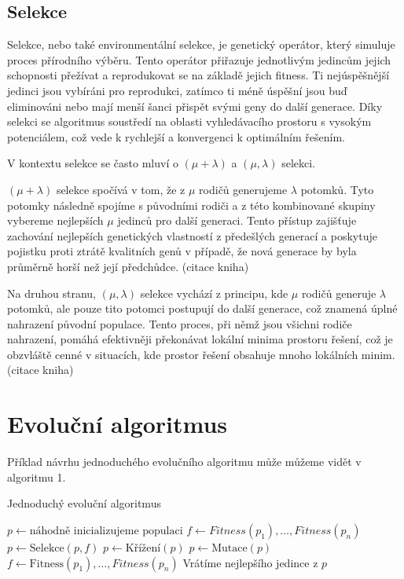 \subsection{Selekce}
Selekce, nebo také environmentální selekce, je genetický operátor, který simuluje proces přírodního výběru. Tento operátor přiřazuje jednotlivým jedincům jejich schopnosti přežívat a reprodukovat se na základě jejich fitness. Ti nejúspěšnější jedinci jsou vybíráni pro reprodukci, zatímco ti méně úspěšní jsou buď eliminováni nebo mají menší šanci přispět svými geny do další generace. Díky selekci se algoritmus soustředí na oblasti vyhledávacího prostoru s vysokým potenciálem, což vede k rychlejší a konvergenci k optimálním řešením. 

V kontextu selekce se často mluví o $(\mu + \lambda)$ a $(\mu, \lambda)$ selekci. 

$(\mu + \lambda)$ selekce spočívá v tom, že z $\mu$ rodičů generujeme $\lambda$ potomků. Tyto potomky následně spojíme s původními rodiči a z této kombinované skupiny vybereme nejlepších $\mu$ jedinců pro další generaci. Tento přístup zajišťuje zachování nejlepších genetických vlastností z předešlých generací a poskytuje pojistku proti ztrátě kvalitních genů v případě, že nová generace by byla průměrně horší než její předchůdce. (citace kniha)

Na druhou stranu, $(\mu, \lambda)$ selekce vychází z principu, kde $\mu$ rodičů generuje $\lambda$ potomků, ale pouze tito potomci postupují do další generace, což znamená úplné nahrazení původní populace. Tento proces, při němž jsou všichni rodiče nahrazení, pomáhá efektivněji překonávat lokální minima prostoru řešení, což je obzvláště cenné v situacích, kde prostor řešení obsahuje mnoho lokálních minim. (citace kniha)

\section{Evoluční algoritmus}

Příklad návrhu jednoduchého evolučního algoritmu může můžeme vidět v algoritmu 1.

\begin{algorithm}
\caption{Jednoduchý evoluční algoritmus}
\begin{algorithmic}[1] 
	\State $p \gets \mbox{náhodně inicializujeme populaci}$
    \State $f \gets Fitness(p_1), \dots, Fitness(p_n)$ 
		\State $p \gets \mbox{Selekce}(p, f)$
		\State $p \gets \mbox{Křížení}(p)$
		\State $p \gets \mbox{Mutace}(p)$
        \State $f \gets \mbox{Fitness}(p_1), \dots, Fitness(p_n)$
    \EndWhile
    \State Vrátíme nejlepšího jedince z $p$
\EndFunction
\end{algorithmic}
\end{algorithm}



